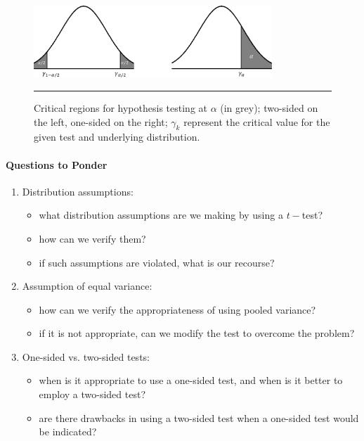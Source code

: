 \begin{figure}[!t]
\centering
\includegraphics[width=0.8\textwidth]{images/SA/crit_reg.png}
\caption[\small Critical regions for hypothesis testing]{\small Critical regions for hypothesis testing at $\alpha$ (in grey); two-sided on the left, one-sided on the right; $\gamma_k$ represent the critical value for the given test and underlying distribution. }\label{fig:crit_reg}\hrule
\end{figure}
\afterpage{\FloatBarrier}
\paragraph{Questions to Ponder}
\begin{enumerate}
    \item Distribution assumptions:
    \begin{itemize}[noitemsep]
        \item what distribution assumptions are we making by using a $t-$test?
        \item how can we verify them?
        \item if such assumptions are violated, what is our recourse?
    \end{itemize}
    \item Assumption of equal variance:
    \begin{itemize}[noitemsep]
        \item how can we verify the appropriateness of using pooled variance?
        \item if it is not appropriate, can we modify the test to overcome the problem?
    \end{itemize}
    \item One-sided vs. two-sided tests:
    \begin{itemize}[noitemsep]
        \item when is it appropriate to use a one-sided test, and when is it better to employ a two-sided test?
        \item are there drawbacks in using a two-sided test when a one-sided test would be indicated?
    \end{itemize}
\end{enumerate}

